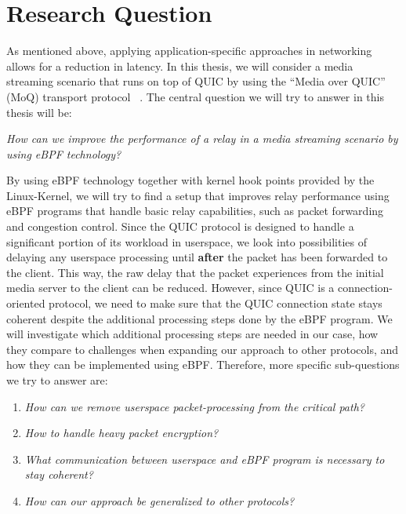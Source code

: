 \section{Research Question}\label{sec:research_question}

As mentioned above, applying application-specific approaches in networking allows for a reduction in latency.
In this thesis, we will consider a media streaming scenario that runs on top of QUIC by using the ``Media over QUIC'' (MoQ) transport protocol
~\parencite{draft-moqtransport}.
The central question we will try to answer in this thesis will be:
\vspace{0.5cm}
\begin{center}
    \textit{How can we improve the performance of a relay in a media streaming scenario by using eBPF technology?}
\end{center}
\vspace{0.5cm}
By using eBPF technology together with kernel hook points provided by the Linux-Kernel, we will try to find a setup that improves relay 
performance using eBPF programs that handle basic relay capabilities, such as packet forwarding and congestion control.
Since the QUIC protocol is designed to handle a significant portion of its workload in userspace, we look into possibilities of delaying any 
userspace processing until \textbf{after} the packet has been forwarded to the client.
This way, the raw delay that the packet experiences from the initial media server to the client can be reduced. 
However, since QUIC is a connection-oriented protocol, we need to make sure that the QUIC connection state stays 
coherent despite the additional processing steps done by the eBPF program.
We will investigate which additional processing steps are needed in our case, how they compare to challenges when expanding our approach to other protocols, 
and how they can be implemented using eBPF\@.
Therefore, more specific sub-questions we try to answer are:
\vspace{0.5cm}
\begin{enumerate}
    \item \textit{How can we remove userspace packet-processing from the critical path?}
    \item \textit{How to handle heavy packet encryption?}
    \item \textit{What communication between userspace and eBPF program is necessary to stay coherent?}
    \item \textit{How can our approach be generalized to other protocols?}
\end{enumerate}
\vspace{0.5cm}